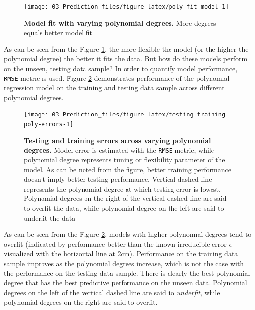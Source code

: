 \documentclass[
]{book}
\begin{document}
\begin{figure}

{\centering \texttt{[image: 03-Prediction\_files/figure-latex/poly-fit-model-1]} 

}

\caption{\textbf{Model fit with varying polynomial degrees. }More degrees equals better model fit}\label{fig:poly-fit-model}
\end{figure}



As can be seen from the Figure \ref{fig:poly-fit-model}, the more flexible the model (or the higher the polynomial degree) the better it fits the data. But how do these models perform on the unseen, testing data sample? In order to quantify model performance, \texttt{RMSE} metric is used. Figure \ref{fig:testing-training-poly-errors} demonstrates performance of the polynomial regression model on the training and testing data sample across different polynomial degrees.

\begin{figure}

{\centering \texttt{[image: 03-Prediction\_files/figure-latex/testing-training-poly-errors-1]} 

}

\caption{\textbf{Testing and training errors across varying polynomial degrees. }Model error is estimated with the \texttt{RMSE} metric, while polynomial degree represents tuning or flexibility parameter of the model. As can be noted from the figure, better training performance doesn't imply better testing performance. Vertical dashed line represents the polynomial degree at which testing error is lowest. Polynomial degrees on the right of the vertical dashed line are said to overfit the data, while polynomial degree on the left are said to underfit the data}\label{fig:testing-training-poly-errors}
\end{figure}



As can be seen from the Figure \ref{fig:testing-training-poly-errors}, models with higher polynomial degrees tend to overfit (indicated by performance better than the known irreducible error \(\epsilon\) visualized with the horizontal line at 2cm). Performance on the training data sample improves as the polynomial degrees increase, which is not the case with the performance on the testing data sample. There is clearly the best polynomial degree that has the best predictive performance on the unseen data. Polynomial degrees on the left of the vertical dashed line are said to \emph{underfit}, while polynomial degrees on the right are said to overfit.
\end{document}
